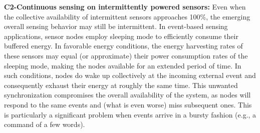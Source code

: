 


\noindent\textbf{C2-Continuous sensing on intermittently powered sensors:}  
Even when the collective availability of intermittent sensors approaches 100\%, the emerging overall sensing behavior may still be intermittent. 
In event-based sensing applications, sensor nodes employ sleeping mode to efficiently consume their buffered energy. In favorable energy conditions, the energy harvesting rates of these sensors may equal (or approximate) their power consumption rates of the sleeping mode, making the nodes available for an extended period of time. 
In such conditions, nodes do wake up collectively at the incoming external event and consequently exhaust their energy at roughly the same time. 
%
This unwanted synchronization compromises the overall availability of the system, as nodes will respond to the same events and (what is even worse) miss subsequent ones. This is particularly a significant problem when events arrive in a bursty fashion (e.g., a command of a few words).


